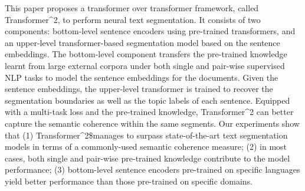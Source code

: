 This paper proposes a transformer over transformer framework, called Transformer^2, to perform neural text segmentation. It consists of two components: bottom-level sentence encoders using pre-trained transformers, and an upper-level transformer-based segmentation model based on the sentence embeddings. The bottom-level component transfers the pre-trained knowledge learnt from large external corpora under both single and pair-wise supervised NLP tasks to model the sentence embeddings for the documents. Given the sentence embeddings, the upper-level transformer is trained to recover the segmentation boundaries as well as the topic labels of each sentence. Equipped with a multi-task loss and the pre-trained knowledge, Transformer^2 can better capture the semantic coherence within the same segments. Our experiments show that (1) Transformer^2\$manages to surpass state-of-the-art text segmentation models in terms of a commonly-used semantic coherence measure; (2) in most cases, both single and pair-wise pre-trained knowledge contribute to the model performance; (3) bottom-level sentence encoders pre-trained on specific languages yield better performance than those pre-trained on specific domains.
